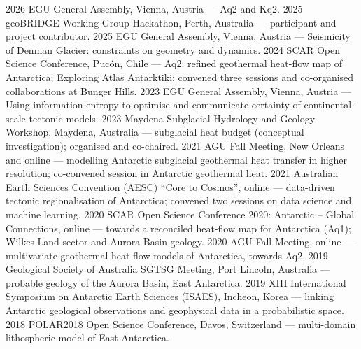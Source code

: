 \documentclass[11pt, a4paper]{cvClass}
\begin{document}
\clearpage
{}

\begin{cvhonors}
  \cvhonor
    {2026}
    {EGU General Assembly, Vienna, Austria — Aq2 and Kq2.}
    {}
    {}
  \cvhonor
    {2025}
    {geoBRIDGE Working Group Hackathon, Perth, Australia — participant and project contributor.}
    {}
    {}
  \cvhonor
    {2025}
    {EGU General Assembly, Vienna, Austria — Seismicity of Denman Glacier: constraints on geometry and dynamics.}
    {}
    {}
  \cvhonor
    {2024}
    {SCAR Open Science Conference, Pucón, Chile — Aq2: refined geothermal heat-flow map of Antarctica; Exploring Atlas Antarktiki; convened three sessions and co-organised collaborations at Bunger Hills.}
    {}
    {}
  \cvhonor
    {2023}
    {EGU General Assembly, Vienna, Austria — Using information entropy to optimise and communicate certainty of continental-scale tectonic models.}
    {}
    {}
  \cvhonor
    {2023}
    {Maydena Subglacial Hydrology and Geology Workshop, Maydena, Australia — subglacial heat budget (conceptual investigation); organised and co-chaired.}
    {}
    {}
  \cvhonor
    {2021}
    {AGU Fall Meeting, New Orleans and online — modelling Antarctic subglacial geothermal heat transfer in higher resolution; co-convened session in Antarctic geothermal heat.}
    {}
    {}
  \cvhonor
    {2021}
    {Australian Earth Sciences Convention (AESC) “Core to Cosmos”, online — data-driven tectonic regionalisation of Antarctica; convened two sessions on data science and machine learning.}
    {}
    {}
  \cvhonor
    {2020}
    {SCAR Open Science Conference 2020: Antarctic – Global Connections, online — towards a reconciled heat-flow map for Antarctica (Aq1); Wilkes Land sector and Aurora Basin geology.}
    {}
    {}
  \cvhonor
    {2020}
    {AGU Fall Meeting, online — multivariate geothermal heat-flow models of Antarctica, towards Aq2.}
    {}
    {}
  \cvhonor
    {2019}
    {Geological Society of Australia SGTSG Meeting, Port Lincoln, Australia — probable geology of the Aurora Basin, East Antarctica.}
    {}
    {}
  \cvhonor
    {2019}
    {XIII International Symposium on Antarctic Earth Sciences (ISAES), Incheon, Korea — linking Antarctic geological observations and geophysical data in a probabilistic space.}
    {}
    {}
  \cvhonor
    {2018}
    {POLAR2018 Open Science Conference, Davos, Switzerland — multi-domain lithospheric model of East Antarctica.}

\end{cvhonors}
\end{document}
